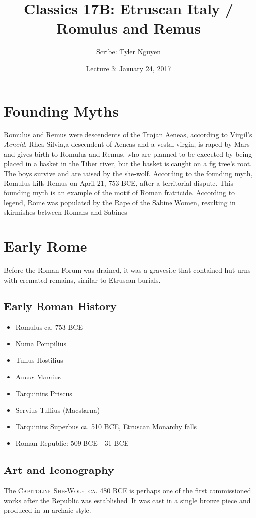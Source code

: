 \documentclass{article}
\begin{document}
\title{Classics 17B: Etruscan Italy / Romulus and Remus}
\author{Scribe: Tyler Nguyen}
\date{Lecture 3: January 24, 2017}
\maketitle
\section{Founding Myths}
Romulus and Remus were descendents of the Trojan Aeneas, according to Virgil's \textit{Aeneid}.  Rhea Silvia,a descendent of Aeneas and a vestal virgin, is raped by Mars and gives birth to Romulus and Remus, who are planned to be executed by being placed in a basket in the Tiber river, but the basket is caught on a fig tree's root.  The boys survive and are raised by the she-wolf.  According to the founding myth, Romulus kills Remus on April 21, 753 BCE, after a territorial dispute.  This founding myth is an example of the motif of Roman fratricide.  According to legend, Rome was populated by the Rape of the Sabine Women, resulting in skirmishes between Romans and Sabines.
\section{Early Rome}
Before the Roman Forum was drained, it was a gravesite that contained hut urns with cremated remains, similar to Etruscan burials.
\subsection{Early Roman History}
\begin{itemize}
\item Romulus ca. 753 BCE
\item Numa Pompilius
\item Tullus Hostilius
\item Ancus Marcius
\item Tarquinius Priscus
\item Servius Tullius (Macstarna)
\item Tarquinius Superbus ca. 510 BCE, Etruscan Monarchy falls
\item Roman Republic: 509 BCE - 31 BCE
\end{itemize}
\subsection{Art and Iconography}
The \textsc{Capitoline She-Wolf, ca. 480 BCE} is perhaps one of the first commissioned works after the Republic was established.  It was cast in a single bronze piece and produced in an archaic style.
\end{document}

